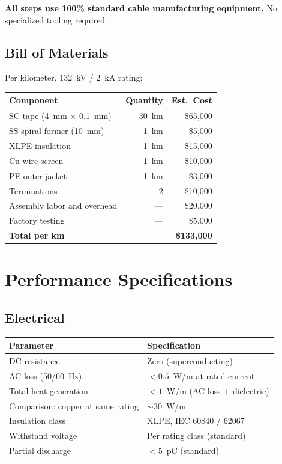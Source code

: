 \documentclass[11pt, a4paper]{article}
\begin{document}
\textbf{All steps use 100\% standard cable manufacturing equipment.}
No specialized tooling required.

\subsection{Bill of Materials}

Per kilometer, 132~kV / 2~kA rating:

\begin{center}
\begin{tabular}{@{}lrr@{}}
\toprule
\textbf{Component} & \textbf{Quantity} & \textbf{Est.\ Cost} \\
\midrule
SC tape (4~mm $\times$ 0.1~mm) & 30~km & \$65{,}000 \\
SS spiral former (10~mm) & 1~km & \$5{,}000 \\
XLPE insulation & 1~km & \$15{,}000 \\
Cu wire screen & 1~km & \$10{,}000 \\
PE outer jacket & 1~km & \$3{,}000 \\
Terminations & 2 & \$10{,}000 \\
Assembly labor and overhead & --- & \$20{,}000 \\
Factory testing & --- & \$5{,}000 \\
\midrule
\textbf{Total per km} & & \textbf{\$133{,}000} \\
\bottomrule
\end{tabular}
\end{center}

\section{Performance Specifications}
\label{sec:performance}

\subsection{Electrical}

\begin{center}
\begin{tabular}{@{}ll@{}}
\toprule
\textbf{Parameter} & \textbf{Specification} \\
\midrule
DC resistance & Zero (superconducting) \\
AC loss (50/60~Hz) & $< 0.5$~W/m at rated current \\
Total heat generation & $< 1$~W/m (AC loss + dielectric) \\
Comparison: copper at same rating & $\sim 30$~W/m \\
Insulation class & XLPE, IEC 60840 / 62067 \\
Withstand voltage & Per rating class (standard) \\
Partial discharge & $< 5$~pC (standard) \\
\bottomrule
\end{tabular}
\end{center}
\end{document}
